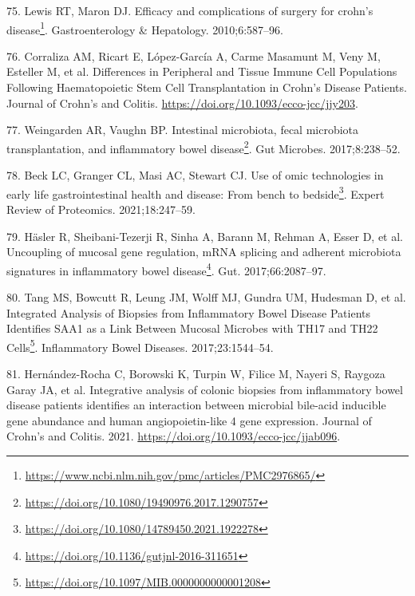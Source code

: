 \documentclass[
  a4paper,
]{book}
\DeclareRobustCommand{\href}[2]{#2\footnote{\url{#1}}}
\newlength{\cslhangindent}
\newlength{\cslentryspacingunit} %
\newenvironment{CSLReferences}[2] %
 {%
  \setlength{\parindent}{0pt}
  \ifodd #1
  \let\oldpar\par
  \def\par{\hangindent=\cslhangindent\oldpar}
  \fi
  \setlength{\parskip}{#2\cslentryspacingunit}
 }%
 {}
\begin{document}
\begin{CSLReferences}{0}{0}
\leavevmode{}%
75. Lewis RT, Maron DJ. \href{https://www.ncbi.nlm.nih.gov/pmc/articles/PMC2976865/}{Efficacy and complications of surgery for crohn's disease}. Gastroenterology \& Hepatology. 2010;6:587--96.

\leavevmode{}%
76. Corraliza AM, Ricart E, López-García A, Carme Masamunt M, Veny M, Esteller M, et al. Differences in Peripheral and Tissue Immune Cell Populations Following Haematopoietic Stem Cell Transplantation in Crohn{'}s Disease Patients. Journal of Crohn's and Colitis. \url{https://doi.org/10.1093/ecco-jcc/jjy203}.

\leavevmode{}%
77. Weingarden AR, Vaughn BP. \href{https://doi.org/10.1080/19490976.2017.1290757}{Intestinal microbiota, fecal microbiota transplantation, and inflammatory bowel disease}. Gut Microbes. 2017;8:238--52.

\leavevmode{}%
78. Beck LC, Granger CL, Masi AC, Stewart CJ. \href{https://doi.org/10.1080/14789450.2021.1922278}{Use of omic technologies in early life gastrointestinal health and disease: From bench to bedside}. Expert Review of Proteomics. 2021;18:247--59.

\leavevmode{}%
79. Häsler R, Sheibani-Tezerji R, Sinha A, Barann M, Rehman A, Esser D, et al. \href{https://doi.org/10.1136/gutjnl-2016-311651}{Uncoupling of mucosal gene regulation, {mRNA} splicing and adherent microbiota signatures in inflammatory bowel disease}. Gut. 2017;66:2087--97.

\leavevmode{}%
80. Tang MS, Bowcutt R, Leung JM, Wolff MJ, Gundra UM, Hudesman D, et al. \href{https://doi.org/10.1097/MIB.0000000000001208}{Integrated Analysis of Biopsies from Inflammatory Bowel Disease Patients Identifies SAA1 as a Link Between Mucosal Microbes with TH17 and TH22 Cells}. Inflammatory Bowel Diseases. 2017;23:1544--54.

\leavevmode{}%
81. Hernández-Rocha C, Borowski K, Turpin W, Filice M, Nayeri S, Raygoza Garay JA, et al. Integrative analysis of colonic biopsies from inflammatory bowel disease patients identifies an interaction between microbial bile-acid inducible gene abundance and human angiopoietin-like 4 gene expression. Journal of Crohn's and Colitis. 2021. \url{https://doi.org/10.1093/ecco-jcc/jjab096}.


\end{CSLReferences}
\end{document}

